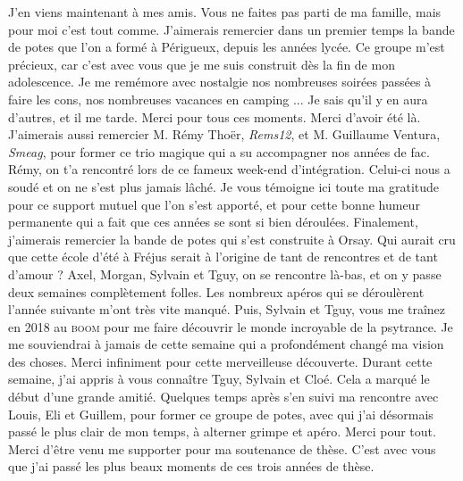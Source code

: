 J'en viens maintenant à mes amis. Vous ne faites pas parti de ma famille, mais pour moi c'est tout comme. J'aimerais remercier dans un premier temps la bande de potes que l'on a formé à Périgueux, depuis les années lycée. Ce groupe m'est précieux, car c'est avec vous que je me suis construit dès la fin de mon adolescence. Je me remémore avec nostalgie nos nombreuses soirées passées à faire les cons, nos nombreuses vacances en camping ... Je sais qu'il y en aura d'autres, et il me tarde. Merci pour tous ces moments. Merci d'avoir été là.
J'aimerais aussi remercier M. Rémy Thoër, \emph{Rems12}, et M. Guillaume Ventura, \emph{Smeag}, pour former ce trio magique qui a su accompagner nos années de fac. Rémy, on t'a rencontré lors de ce fameux week-end d'intégration. Celui-ci nous a soudé et on ne s'est plus jamais lâché. Je vous témoigne ici toute ma gratitude pour ce support mutuel que l'on s'est apporté, et pour cette bonne humeur permanente qui a fait que ces années se sont si bien déroulées.
Finalement, j'aimerais remercier la bande de potes qui s'est construite à Orsay. Qui aurait cru que cette école d'été à Fréjus serait à l'origine de tant de rencontres et de tant d'amour ? Axel, Morgan, Sylvain et Tguy, on se rencontre là-bas, et on y passe deux semaines complètement folles. Les nombreux apéros qui se déroulèrent l'année suivante m'ont très vite manqué. Puis, Sylvain et Tguy, vous me traînez en \num{2018} au \textsc{boom} pour me faire découvrir le monde incroyable de la psytrance. Je me souviendrai à jamais de cette semaine qui a profondément changé ma vision des choses. Merci infiniment pour cette merveilleuse découverte. Durant cette semaine, j'ai appris à vous connaître Tguy, Sylvain et Cloé. Cela a marqué le début d'une grande amitié. Quelques temps après s'en suivi ma rencontre avec Louis, Eli et Guillem, pour former ce groupe de potes, avec qui j'ai désormais passé le plus clair de mon temps, à alterner grimpe et apéro.
Merci pour tout. Merci d'être venu me supporter pour ma soutenance de thèse. C'est avec vous que j'ai passé les plus beaux moments de ces trois années de thèse.



% 
